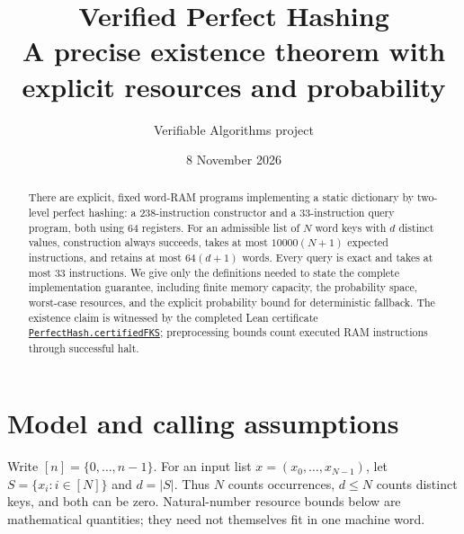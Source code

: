 \documentclass[11pt,a4paper]{article}
\title{Verified Perfect Hashing\\[0.3em]
  \large A precise existence theorem with explicit resources and probability}
\author{Verifiable Algorithms project}
\date{8 November 2026}
\theoremstyle{definition}
\newcommand{\code}[1]{\nolinkurl{#1}}
\newcommand{\src}[3]{\href{https://github.com/ilyaraz/verified_algorithms/blob/f67e943886482e132334af0f922f24dd58bb4cdc/#1\#L#2}{#3}}
\begin{document}
\maketitle
\begin{abstract}
There are explicit, fixed word-RAM programs implementing a static dictionary
by two-level perfect hashing: a 238-instruction constructor and a
33-instruction query program, both using 64 registers. For an admissible
list of $N$ word keys with $d$ distinct values, construction always succeeds,
takes at most $10000(N+1)$ expected instructions, and retains at most
$64(d+1)$ words. Every query is exact and takes at most 33 instructions.
We give only the definitions needed to state the complete implementation
guarantee, including finite memory capacity, the probability space, worst-case
resources, and the explicit probability bound for deterministic fallback.
The existence claim is witnessed by the completed Lean certificate
\src{DataStructures/PerfectHash/Certified.lean}{14}{\code{PerfectHash.certifiedFKS}}; preprocessing bounds count executed RAM
instructions through successful halt.
\end{abstract}

\section{Model and calling assumptions}

Write $[n]=\{0,\ldots,n-1\}$. For an input list
$x=(x_0,\ldots,x_{N-1})$, let $S=\{x_i:i\in[N]\}$ and $d=|S|$.
Thus $N$ counts occurrences, $d\le N$ counts distinct keys, and both can be
zero. Natural-number resource bounds below are mathematical quantities;
they need not themselves fit in one machine word.
\end{document}
